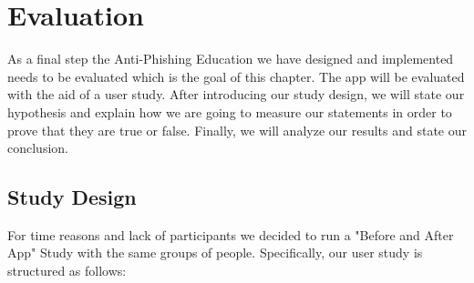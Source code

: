 \section{Evaluation}
\label{s:evaluation}
As a final step the Anti-Phishing Education we have designed and implemented needs to be evaluated which is the goal of this chapter. The app will be evaluated with the aid of a user study. After introducing our study design, we will state our hypothesis and explain how we are going to measure our statements in order to prove that they are true or false. Finally, we will analyze our results and state our conclusion.



\subsection{Study Design}
For time reasons and lack of participants we decided to run a "Before and After App" Study with the same groups of people. Specifically, our user study is structured as follows:

